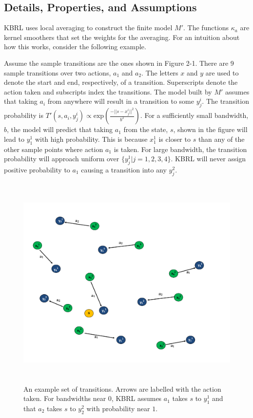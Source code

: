 \subsection{Details, Properties, and Assumptions}
KBRL uses local averaging to construct the finite model $M'$.
The functions $\kappa_a$ are kernel smoothers that set the weights
for the averaging.
For an intuition about how this works, consider the following example.

Assume the sample transitions are the ones shown in Figure 2-1.
There are 9 sample transitions over two actions, $a_1$ and $a_2$.
The letters $x$ and $y$ are used to denote the start and end, respectively,
of a transition.
Superscripts denote the action taken and subscripts index the transitions.
The model built by $M'$ assumes that taking $a_i$ from anywhere 
will result in a transition to some $y^i_j$. The transition probability is
$T'(s,a_i, y^i_j) \propto \mathrm{exp}(\frac{-||s-x^i_j||^2}{b^2})$.
For a sufficiently small bandwidth, $b$, the model will predict that
taking $a_1$ from the state, $s$, shown in the figure will lead to
$y^1_1$ with high probability. This is because $x^1_1$ is
closer to $s$ than any of the other sample points where action $a_1$
is taken.
For large bandwidth, the transition probability will approach uniform over
$\{y^1_j | j= 1,2,3,4\}$.
KBRL will never assign positive probability to $a_1$ causing a transition
into any $y^2_j$.

\begin{figure}[h!]
  \centering
    \includegraphics[width=120mm, height=108mm]{figs/kbrlexpl.pdf}
  \caption[Explanation of the the KBRL finite model]{An example set of transitions.
      Arrows are labelled with the action taken.
      For bandwidths near $0$, KBRL assumes $a_1$ takes $s$ to $y^1_1$ and
      that $a_2$ takes $s$ to $y^2_2$ with probability near $1$.}
\end{figure}

